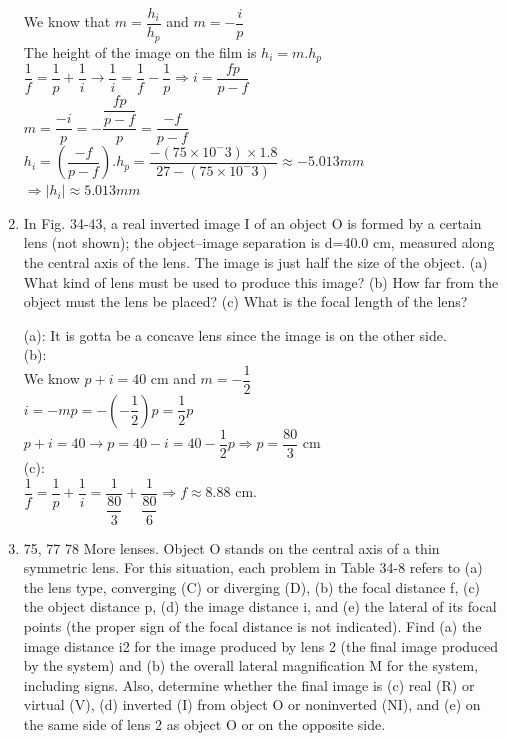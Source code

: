 \documentclass[fleqn]{article}
\begin{document}
\begin{enumerate}
    \textcolor{hwColor}{
      We know that $m=\dfrac{h_i}{h_p}$ and $m=-\dfrac{i}{p}$ \\
      The height of the image on the film is $h_i=m.h_p$ \\
      $\dfrac{1}{f}=\dfrac{1}{p}+\dfrac{1}{i} \rightarrow \dfrac{1}{i}=\dfrac{1}{f}-\dfrac{1}{p} \Longrightarrow i=\dfrac{fp}{p-f}$ \\
      $m=\dfrac{-i}{p}=-\dfrac{\dfrac{fp}{p-f}}{p}=\dfrac{-f}{p-f}$ \\
      $h_i=(\dfrac{-f}{p-f}).h_p=\dfrac{-(75\times10^-3)\times 1.8}{27-(75\times10^-3)}\approx -5.013 mm$ \\
      \bigbreak
      $\Longrightarrow |h_i|\approx 5.013 mm$
    }

    \item In Fig. 34-43, a real inverted image I of an object O is formed by a certain lens (not shown); the object–image separation is d=40.0 cm, measured along the central axis of the lens. The image is just half the size of the object. (a) What kind of lens must be used to produce this image? (b) How far from the object must the lens be placed? (c) What is the focal length of the lens?

    \textcolor{hwColor}{
      (a): It is gotta be a concave lens since the image is on the other side. \\
      (b): \\
      We know $p+i=40$ cm and $m=-\dfrac{1}{2}$ \\
      $i=-mp=-(-\dfrac{1}{2})p=\dfrac{1}{2}p$ \\
      $p+i=40 \rightarrow p=40-i=40-\dfrac{1}{2}p \Longrightarrow p=\dfrac{80}{3}$ cm \\
      (c): \\
      $\dfrac{1}{f}=\dfrac{1}{p}+\dfrac{1}{i}=\dfrac{1}{\dfrac{80}{3}}+\dfrac{1}{\dfrac{80}{6}} \Longrightarrow f\approx 8.88$ cm.
    }
    
    \item 75, 77 78 More lenses. Object O stands on the central axis of a thin symmetric lens. For this situation, each problem in Table 34-8 refers to (a) the lens type, converging (C) or diverging (D), (b) the focal distance f, (c) the object distance p, (d) the image distance i, and (e) the lateral of its focal points (the proper sign of the focal distance is not indicated). Find (a) the image distance i2 for the image produced by lens 2 (the final image produced by the system) and (b) the overall lateral magnification M for the system, including signs. Also, determine whether the final image is (c) real (R) or virtual (V), (d) inverted (I) from object O or noninverted (NI), and (e) on the same side of lens 2 as object O or on the opposite side.


\end{enumerate}
\end{document}
